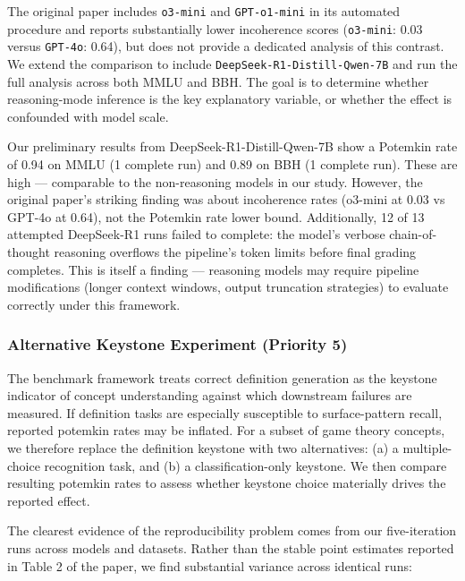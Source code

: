 \documentclass[sigconf,authordraft]{acmart}
\begin{document}
The original paper includes \texttt{o3-mini} and \texttt{GPT-o1-mini} in its automated procedure and reports substantially lower incoherence scores (\texttt{o3-mini}: 0.03 versus \texttt{GPT-4o}: 0.64), but does not provide a dedicated analysis of this contrast. We extend the comparison to include \texttt{DeepSeek-R1-Distill-Qwen-7B} and run the full analysis across both MMLU and BBH. The goal is to determine whether reasoning-mode inference is the key explanatory variable, or whether the effect is confounded with model scale.

Our preliminary results from DeepSeek-R1-Distill-Qwen-7B show a Potemkin rate of 0.94 on MMLU (1 complete run) and 0.89 on BBH (1 complete run). These are high --- comparable to the non-reasoning models in our study. However, the original paper's striking finding was about incoherence rates (o3-mini at 0.03 vs GPT-4o at 0.64), not the Potemkin rate lower bound. Additionally, 12 of 13 attempted DeepSeek-R1 runs failed to complete: the model's verbose chain-of-thought reasoning overflows the pipeline's token limits before final grading completes. This is itself a finding --- reasoning models may require pipeline modifications (longer context windows, output truncation strategies) to evaluate correctly under this framework.


\subsubsection{Alternative Keystone Experiment (Priority 5)}

The benchmark framework treats correct definition generation as the keystone indicator of concept understanding against which downstream failures are measured. If definition tasks are especially susceptible to surface-pattern recall, reported potemkin rates may be inflated. For a subset of game theory concepts, we therefore replace the definition keystone with two alternatives: (a) a multiple-choice recognition task, and (b) a classification-only keystone. We then compare resulting potemkin rates to assess whether keystone choice materially drives the reported effect.


The clearest evidence of the reproducibility problem comes from our five-iteration runs across models and datasets. Rather than the stable point estimates reported in Table 2 of the paper, we find substantial variance across identical runs:
\end{document}
